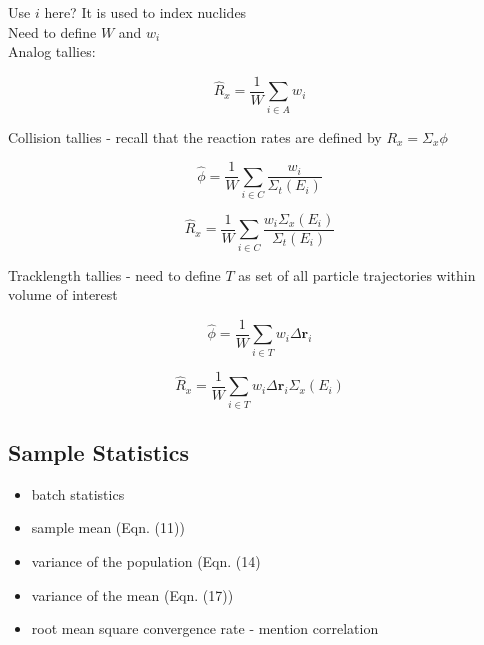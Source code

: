 Use $i$ here? It is used to index nuclides\\
Need to define $W$ and $w_{i}$\\

Analog tallies:

\begin{dmath}
\label{eqn:chap3-tallies-analog}
\hat{R}_{x} = \frac{1}{W}\displaystyle\sum\limits_{i \in A} w_{i}
\end{dmath}

Collision tallies - recall that the reaction rates are defined by $R_{x} = \Sigma_{x}\phi$

\begin{dmath}
\label{eqn:chap3-tallies-collision-flux}
\hat{\phi} = \frac{1}{W}\displaystyle\sum\limits_{i \in C}\frac{w_{i}}{\Sigma_{t}(E_{i})}
\end{dmath}

\begin{dmath}
\label{eqn:chap3-tallies-collision-rxn}
\hat{R}_{x} = \frac{1}{W}\displaystyle\sum\limits_{i \in C}\frac{w_{i}\Sigma_{x}(E_{i})}{\Sigma_{t}(E_{i})}
\end{dmath}

Tracklength tallies - need to define $T$ as set of all particle trajectories within volume of interest

\begin{dmath}
\label{eqn:chap3-tallies-tracklength-flux}
  \hat{\phi} = \frac{1}{W}\displaystyle\sum\limits_{i \in T}w_{i}\Delta\mathbf{r}_{i}
\end{dmath}

\begin{dmath}
\label{eqn:chap3-tallies-tracklength-rxn}
  \hat{R}_{x} = \frac{1}{W}\displaystyle\sum\limits_{i \in T}w_{i}\Delta\mathbf{r}_{i}\Sigma_{x}(E_{i})
\end{dmath}


\subsection{Sample Statistics}
\label{subsec:chap3-mc-stats}

\begin{itemize}[noitemsep]
  \item batch statistics
  \item sample mean (Eqn. (11))
  \item variance of the population (Eqn. (14)
  \item variance of the mean (Eqn. (17))
  \item root mean square convergence rate - mention correlation
\end{itemize}


